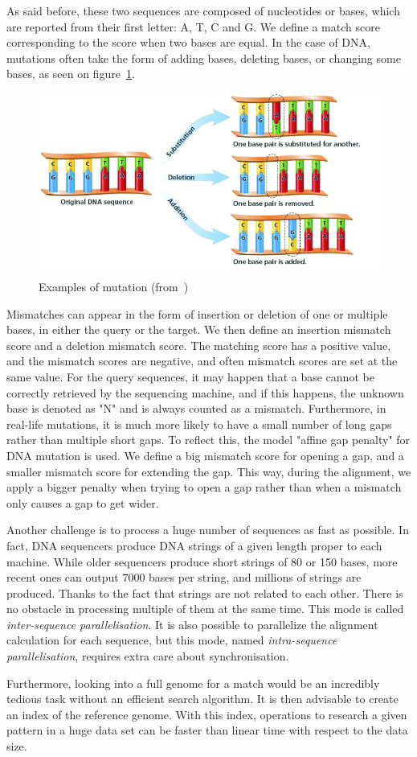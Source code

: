 As said before, these two sequences are composed of nucleotides or bases, which are reported from their first letter: A, T, C and G. We define a match score corresponding to the score when two bases are equal. In the case of DNA, mutations often take the form of adding bases, deleting bases, or changing some bases, as seen on figure~\ref{fig:mutation}. 
\begin{figure}[h!]
	\centering
	\includegraphics[width=0.7\linewidth]{mutation}
	\caption{Examples of mutation (from~\cite{alasadi:chemistry})}
	\label{fig:mutation}
\end{figure}
Mismatches can appear in the form of insertion or deletion of one or multiple bases, in either the query or the target. We then define an insertion mismatch score and a deletion mismatch score. The matching score has a positive value, and the mismatch scores are negative, and often mismatch scores are set at the same value. For the query sequences, it may happen that a base cannot be correctly retrieved by the sequencing machine, and if this happens, the unknown base is denoted as "N" and is always counted as a mismatch. Furthermore, in real-life mutations, it is much more likely to have a small number of long gaps rather than multiple short gaps. To reflect this, the model "affine gap penalty" for DNA mutation is used. We define a big mismatch score for opening a gap, and a smaller mismatch score for extending the gap. This way, during the alignment, we apply a bigger penalty when trying to open a gap rather than when a mismatch only causes a gap to get wider. 

Another challenge is to process a huge number of sequences as fast as possible. In fact, DNA sequencers produce DNA strings of a given length proper to each machine. While older sequencers produce short strings of 80 or 150 bases, more recent ones can output 7000 bases per string, and millions of strings are produced. Thanks to the fact that strings are not related to each other. There is no obstacle in processing multiple of them at the same time. This mode is called \emph{inter-sequence parallelisation}. It is also possible to parallelize the alignment calculation for each sequence, but this mode, named \emph{intra-sequence parallelisation}, requires extra care about synchronisation.

Furthermore, looking into a full genome for a match would be an incredibly tedious task without an efficient search algorithm. It is then advisable to create an index of the reference genome. With this index, operations to research a given pattern in a huge data set can be faster than linear time with respect to the data size.

